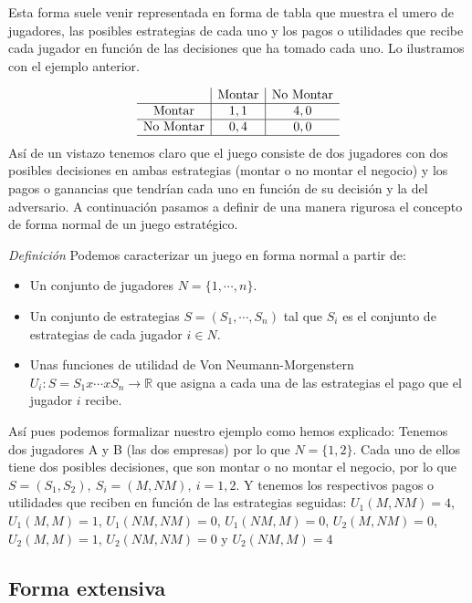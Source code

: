\documentclass[12pt,a4paper,]{book}
\numberwithin{dummy}{section}
\theoremstyle{ocrenumbox}
\theoremstyle{blacknumex}
\theoremstyle{blacknumbox}
\theoremstyle{ocrenum}
\theoremstyle{ocrenum}
\begin{document}
Esta forma suele venir representada en forma de tabla que muestra el
umero de jugadores, las posibles estrategias de cada uno y los pagos o
utilidades que recibe cada jugador en función de las decisiones que ha
tomado cada uno. Lo ilustramos con el ejemplo anterior.

\[
\begin{array}{c|c|c}
 & \text{Montar} & \text{No Montar} \\
\hline
\text{Montar} & 1,1 & 4,0 \\
\hline
\text{No Montar} & 0,4 & 0,0 \\
\hline
\end{array}
\] Así de un vistazo tenemos claro que el juego consiste de dos
jugadores con dos posibles decisiones en ambas estrategias (montar o no
montar el negocio) y los pagos o ganancias que tendrían cada uno en
función de su decisión y la del adversario. A continuación pasamos a
definir de una manera rigurosa el concepto de forma normal de un juego
estratégico.

\emph{Definición} Podemos caracterizar un juego en forma normal a partir
de:

\begin{itemize}
\item
  Un conjunto de jugadores \(N=\{1,\cdots,n\}\).
\item
  Un conjunto de estrategias \(S=(S_1,\cdots,S_n)\) tal que \(S_i\) es
  el conjunto de estrategias de cada jugador \(i \in N\).
\item
  Unas funciones de utilidad de Von Neumann-Morgenstern
  \(U_i:S=S_1x\cdots xS_n \rightarrow \mathbb{R}\) que asigna a cada una
  de las estrategias el pago que el jugador \(i\) recibe.
\end{itemize}

Así pues podemos formalizar nuestro ejemplo como hemos explicado:
Tenemos dos jugadores A y B (las dos empresas) por lo que \(N=\{1,2\}\).
Cada uno de ellos tiene dos posibles decisiones, que son montar o no
montar el negocio, por lo que \(S=(S_1,S_2), \ S_i=(M,NM), \ i=1,2\). Y
tenemos los respectivos pagos o utilidades que reciben en función de las
estrategias seguidas: \(U_1(M,NM)=4\), \(U_1(M,M)=1\), \(U_1(NM,NM)=0\),
\(U_1(NM,M)=0\), \(U_2(M,NM)=0\), \(U_2(M,M)=1\), \(U_2(NM,NM)=0\) y
\(U_2(NM,M)=4\)

\hypertarget{Seccion222}{%
\subsection{Forma extensiva}\label{Seccion222}}
\end{document}
